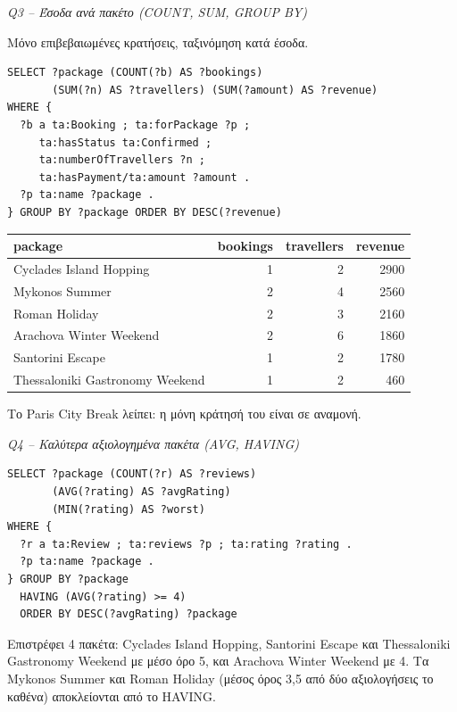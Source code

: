 \documentclass[conference]{IEEEtran}
\newcommand{\query}[1]{\par\medskip\noindent\textit{#1}\par\nobreak\smallskip}
\begin{document}
\query{Q3 -- Έσοδα ανά πακέτο (COUNT, SUM, GROUP BY)}
Μόνο επιβεβαιωμένες κρατήσεις, ταξινόμηση κατά έσοδα.
\begin{lstlisting}
SELECT ?package (COUNT(?b) AS ?bookings)
       (SUM(?n) AS ?travellers) (SUM(?amount) AS ?revenue)
WHERE {
  ?b a ta:Booking ; ta:forPackage ?p ;
     ta:hasStatus ta:Confirmed ;
     ta:numberOfTravellers ?n ;
     ta:hasPayment/ta:amount ?amount .
  ?p ta:name ?package .
} GROUP BY ?package ORDER BY DESC(?revenue)
\end{lstlisting}
\begin{center}\scriptsize\setlength{\tabcolsep}{4pt}
\begin{tabular}{@{}lrrr@{}}
\toprule
package & bookings & travellers & revenue \\
\midrule
Cyclades Island Hopping & 1 & 2 & 2900 \\
Mykonos Summer & 2 & 4 & 2560 \\
Roman Holiday & 2 & 3 & 2160 \\
Arachova Winter Weekend & 2 & 6 & 1860 \\
Santorini Escape & 1 & 2 & 1780 \\
Thessaloniki Gastronomy Weekend & 1 & 2 & 460 \\
\bottomrule
\end{tabular}\end{center}
Το Paris City Break λείπει: η μόνη κράτησή του είναι σε αναμονή.

\query{Q4 -- Καλύτερα αξιολογημένα πακέτα (AVG, HAVING)}
\begin{lstlisting}
SELECT ?package (COUNT(?r) AS ?reviews)
       (AVG(?rating) AS ?avgRating)
       (MIN(?rating) AS ?worst)
WHERE {
  ?r a ta:Review ; ta:reviews ?p ; ta:rating ?rating .
  ?p ta:name ?package .
} GROUP BY ?package
  HAVING (AVG(?rating) >= 4)
  ORDER BY DESC(?avgRating) ?package
\end{lstlisting}
Επιστρέφει 4 πακέτα: Cyclades Island Hopping, Santorini Escape και Thessaloniki
Gastronomy Weekend με μέσο όρο 5, και Arachova Winter Weekend με 4. Τα Mykonos
Summer και Roman Holiday (μέσος όρος 3,5 από δύο αξιολογήσεις το καθένα)
αποκλείονται από το HAVING.
\end{document}
